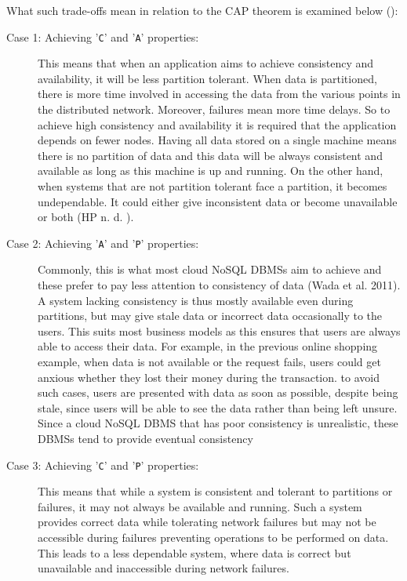 What such trade-offs mean in relation to the CAP theorem is examined below
():

\begin{description}
  \item [Case 1: Achieving '\texttt{C}' and '\texttt{A}' properties:] This
  means that when an application aims to achieve consistency and availability,  
  it will be less partition tolerant. 
When data is partitioned,   there is more time involved in accessing the data from
the various points in the distributed network.  Moreover,   failures mean more time
delays.  So to achieve high consistency and availability it is required
that the application depends on fewer nodes.  Having all data stored on a single
machine means there is no partition of data and this data will be always
consistent and available as long as this machine is up and running.   On the other hand,   when systems that are not partition tolerant face a
partition,   it becomes undependable.  It could either give inconsistent data
or become unavailable or both (HP n. d. ). 
\item [Case 2: Achieving '\texttt{A}' and '\texttt{P}' properties:]
Commonly,   this is what most cloud \ac{NoSQL} \acp{DBMS} aim to achieve and these
prefer to pay less attention to consistency of data (Wada et al.  2011).  A system
lacking consistency is thus mostly available even during partitions,   but
may give stale data or incorrect data occasionally to the users.  This suits
most business models as this ensures that users are always able to
access their data.  For example,   in the previous online shopping example,   when
data is not available or the request fails,   users could get anxious whether
they lost their money during the transaction.  to avoid such cases,   users
are presented with data as soon as possible,   despite being stale,   since users
will be able to see the data rather than being left unsure. 
Since a cloud \ac{NoSQL} \ac{DBMS} that has poor consistency is unrealistic,  
these \acp{DBMS} tend to provide eventual consistency

\item [Case 3: Achieving '\texttt{C}' and '\texttt{P}' properties:] This means
that while a system is consistent and tolerant to partitions or
failures,   it may not always be available and running.  Such a system 
provides correct data while tolerating network failures but may not be
accessible during failures preventing operations to be performed on data.  This
leads to a less dependable system,   where data is correct but unavailable and
inaccessible during network failures. 
\end{description}

